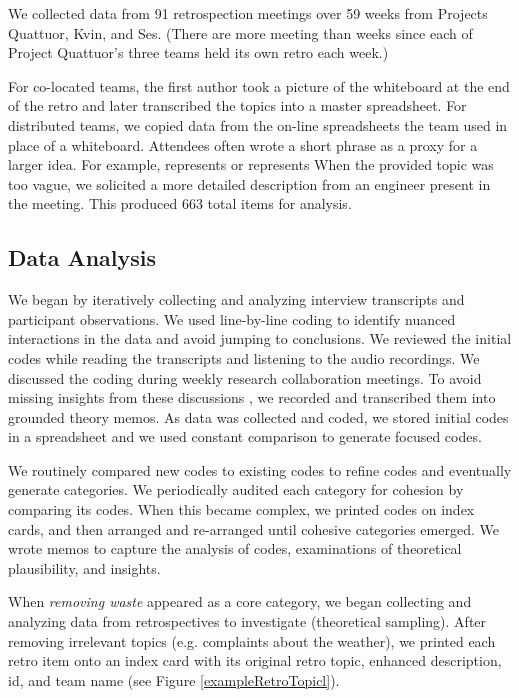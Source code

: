 We collected data from 91 retrospection meetings over 59 weeks from Projects Quattuor, Kvin, and Ses. (There are more meeting than weeks since each of Project Quattuor's three teams held its own retro each week.)

For co-located teams, the first author took a picture of the whiteboard at the end of the retro and later transcribed the topics into a master spreadsheet. For distributed teams, we copied data from the on-line spreadsheets the team used in place of a whiteboard. Attendees often wrote a short phrase as a proxy for a larger idea. For example,  represents  or  represents  When the provided topic was too vague, we solicited a more detailed description from an engineer present in the meeting. This produced 663 total items for analysis. 
\subsection{Data Analysis}
We began by iteratively collecting and analyzing interview transcripts and participant observations. We used line-by-line coding \cite{Charmaz} to identify nuanced interactions in the data and avoid jumping to conclusions. We reviewed the initial codes while reading the transcripts and listening to the audio recordings. We discussed the coding during weekly research collaboration meetings. To avoid missing insights from these discussions \cite{GlaserTheoreticalSensitivity}, we recorded and transcribed them into grounded theory memos. As data was collected and coded, we stored initial codes in a spreadsheet and we used constant comparison to generate focused codes.

We routinely compared new codes to existing codes to refine codes and eventually generate categories. We periodically audited each category for cohesion by comparing its codes. When this became complex, we printed codes on index cards, and then arranged and re-arranged until cohesive categories emerged. We wrote memos to capture the analysis of codes, examinations of theoretical plausibility, and insights.

When \textit{removing waste} appeared as a core category, we began collecting and analyzing data from retrospectives to investigate (theoretical sampling). After removing irrelevant topics (e.g. complaints about the weather), we printed each retro item onto an index card with its original retro topic, enhanced description, id, and team name (see Figure \ref{exampleRetroTopicl}).

